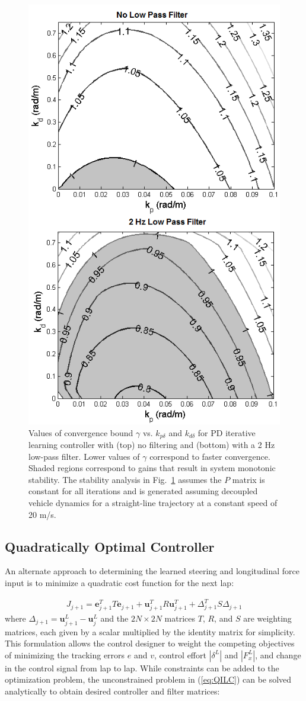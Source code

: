 \documentclass[9pt,shortpaper,twoside,web]{ieeecolor}
\begin{document}
\begin{figure}[tb]
\centering
\includegraphics[width=2 in]{figures/monotonicStability.png}
\caption[Values of convergence bound $\gamma$ vs. $k_{p\delta}$ and $k_{d\delta}$ for PD iterative learning controller]{Values of convergence bound $\gamma$ vs. $k_{p\delta}$ and $k_{d\delta}$ for PD iterative learning controller with (top) no filtering and (bottom) with a 2 Hz low-pass filter. Lower values of $\gamma$ correspond to faster convergence.
Shaded regions correspond to gains that result in system monotonic stability. The stability analysis in Fig.~\ref{fig:stabPlot} assumes the $P$ matrix is constant for all iterations and is generated assuming decoupled vehicle dynamics
 for a straight-line trajectory at a constant speed of 20 m/s.}
\label{fig:stabPlot}
\end{figure}


\subsection{Quadratically Optimal Controller}\label{sec:controller}
\label{sec:qopt}
An alternate approach to determining the learned steering and longitudinal force input is to minimize a quadratic cost function for the next lap:

\begin{align}
J_{j\!+\!1} = \textbf{e}_{j\!+\!1}^TT\textbf{e}_{j\!+\!1} + \textbf{u}^T_{j\!+\!1} R \textbf{u}^T_{j\!+\!1}+\Delta_{j\!+\!1}^TS\Delta_{j\!+\!1}
\label{eq:QILC}
\end{align}
where $\Delta_{j\!+\!1} = \mathbf{u}^L_{j\!+\!1} - \mathbf{u}^L_j$ and the $2N \times 2N$ matrices $T$, $R$, and $S$ are weighting matrices, each given
by a scalar multiplied by the identity matrix for simplicity.
This formulation allows the control designer to weight the competing objectives of minimizing the tracking errors $e$ and $v$, control effort $|\delta^L|$ and $|F^L_x|$, and change in the control signal from lap to lap.
While constraints can be added to the optimization problem, the unconstrained problem in (\ref{eq:QILC}) can be solved analytically \cite{bristow2008} to obtain desired controller and filter matrices:
\end{document}
